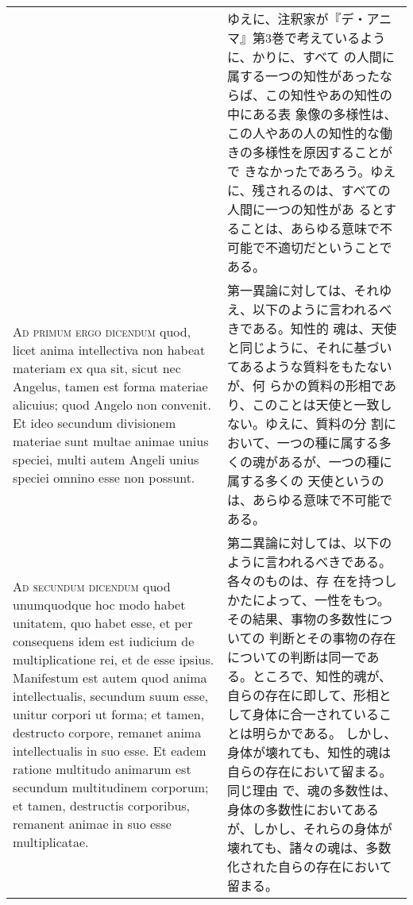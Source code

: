 \documentclass[paper=a4paper,fontsize=10pt,jafontsize=9pt,titlepage]{jlreq}
\begin{document}
\begin{longtable}{p{21em}p{21em}}
&

ゆえに、注釈家が『デ・アニマ』第3巻で考えているように、かりに、すべて
の人間に属する一つの知性があったならば、この知性やあの知性の中にある表
象像の多様性は、この人やあの人の知性的な働きの多様性を原因することがで
きなかったであろう。ゆえに、残されるのは、すべての人間に一つの知性があ
るとすることは、あらゆる意味で不可能で不適切だということである。
 
\\


{\scshape Ad primum ergo dicendum} quod, licet anima intellectiva non
habeat materiam ex qua sit, sicut nec Angelus, tamen est forma
materiae alicuius; quod Angelo non convenit. Et ideo secundum
divisionem materiae sunt multae animae unius speciei, multi autem
Angeli unius speciei omnino esse non possunt.

&

 第一異論に対しては、それゆえ、以下のように言われるべきである。知性的
 魂は、天使と同じように、それに基づいてあるような質料をもたないが、何
 らかの質料の形相であり、このことは天使と一致しない。ゆえに、質料の分
 割において、一つの種に属する多くの魂があるが、一つの種に属する多くの
 天使というのは、あらゆる意味で不可能である。
 
\\



{\scshape Ad secundum dicendum} quod unumquodque hoc modo habet
unitatem, quo habet esse, et per consequens idem est iudicium de
multiplicatione rei, et de esse ipsius. Manifestum est autem quod
anima intellectualis, secundum suum esse, unitur corpori ut forma; et
tamen, destructo corpore, remanet anima intellectualis in suo esse. Et
eadem ratione multitudo animarum est secundum multitudinem corporum;
et tamen, destructis corporibus, remanent animae in suo esse
multiplicatae.

&

 第二異論に対しては、以下のように言われるべきである。各々のものは、存
 在を持つしかたによって、一性をもつ。その結果、事物の多数性についての
 判断とその事物の存在についての判断は同一である。ところで、知性的魂が、
 自らの存在に即して、形相として身体に合一されていることは明らかである。
 しかし、身体が壊れても、知性的魂は自らの存在において留まる。同じ理由
 で、魂の多数性は、身体の多数性においてあるが、しかし、それらの身体が
 壊れても、諸々の魂は、多数化された自らの存在において留まる。

 
\\




\end{longtable}
\end{document}
